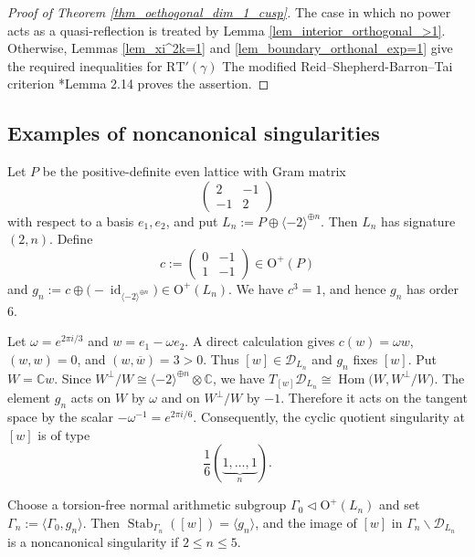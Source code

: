 \documentclass[11pt]{amsart}
\theoremstyle{plain}
\theoremstyle{definition}
\numberwithin{equation}{section}
\def\id{\mathop{\mathrm{id}}\nolimits}
\def\Hom{\mathop{\mathrm{Hom}}\nolimits}
\def\Stab{\mathop{\mathrm{Stab}}\nolimits}
\def\Hom{\mathop{\mathrm{Hom}}\nolimits}
\def\O{\mathrm{O}}
\begin{document}
\begin{proof}[Proof of Theorem \ref{thm_oethogonal_dim_1_cusp}]
 The case in which no power acts as a quasi-reflection
is treated by Lemma \ref{lem_interior_orthogonal_>1}.
Otherwise, Lemmas \ref{lem_xi^2k=1} and
\ref{lem_boundary_orthonal_exp=1} give the required inequalities for $\mathrm{RT}'(\gamma)$
The modified Reid--Shepherd-Barron--Tai criterion \cite{Gritsenko2007kodaira}*{Lemma 2.14} proves the assertion.
\end{proof}

\subsection{Examples of noncanonical singularities}
\label{subsec:An example showing the optimality of the bound}
Let $P$ be the positive-definite even lattice with Gram matrix
\[
  \begin{pmatrix}
    2 & -1\\
    -1 & 2
  \end{pmatrix}
\]
with respect to a basis $e_1,e_2$, and put $L_n
  :=
  P\oplus \langle -2\rangle^{\oplus n}$.
Then $L_n$ has signature $(2,n)$.  Define
\[
  c
  :=
  \begin{pmatrix}
    0 & -1\\
    1 & -1
  \end{pmatrix}
  \in \O^+(P)
\]
and $g_n
  :=
  c\oplus
  \bigl(-\id_{\langle-2\rangle^{\oplus n}}\bigr)
  \in \O^+(L_n)$.
We have $c^3=1$, and hence $g_n$ has order $6$.

Let 
$\omega=e^{2\pi i/3}$ and $w=e_1-\omega e_2$.
A direct calculation gives $c(w)=\omega w$, $(w,w)=0$, and $(w,\overline w)=3>0$.
Thus $[w]\in\mathcal{D}_{L_n}$ and $g_n$ fixes $[w]$.
Put $W=\mathbb Cw$.  Since $W^\perp/W
  \cong
  \langle-2\rangle^{\oplus n}\otimes\mathbb C$,
we have 
  $T_{[w]}\mathcal{D}_{L_n}
  \cong
  \Hom\bigl(W,W^\perp/W\bigr)$.
The element $g_n$ acts on $W$ by $\omega$ and on
$W^\perp/W$ by $-1$.  Therefore it acts on the tangent
space by the scalar $-\omega^{-1}
  =
  e^{2\pi i/6}$.
Consequently, the cyclic quotient singularity at $[w]$ is
of type
\[
  \frac{1}{6}(\underbrace{1,\ldots,1}_{n}).
\]

Choose a torsion-free normal arithmetic
subgroup $\Gamma_0\triangleleft \O^+(L_n)$
and set $\Gamma_n:=\langle\Gamma_0,g_n\rangle$.
Then $\Stab_{\Gamma_n}([w])=\langle g_n\rangle$,
and the image of $[w]$ in
$\Gamma_n\backslash\mathcal{D}_{L_n}$ is a noncanonical singularity if $2\leq n \leq 5$.
\end{document}
